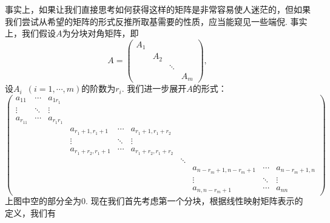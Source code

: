 事实上，如果让我们直接思考如何获得这样的矩阵是非常容易使人迷茫的，但如果我们尝试从希望的矩阵的形式反推所取基需要的性质，应当能窥见一些端倪. 事实上，我们假设$A$为分块对角矩阵，即
\[A=\begin{pmatrix}
        A_1 &     &        &     \\
            & A_2 &        &     \\
            &     & \ddots &     \\
            &     &        & A_m
    \end{pmatrix},\]
设$A_i\enspace(i=1,\cdots,m)$的阶数为$r_i$. 我们进一步展开$A$的形式：
\[\begin{pmatrix}
        a_{11}   & \cdots & a_{1r_1}   &                   &        &                     &        &                     &        &               \\
        \vdots   & \ddots & \vdots     &                   &        &                     &        &                     &        &               \\
        a_{r_11} & \cdots & a_{r_1r_1} &                   &        &                     &        &                     &        &               \\
                 &        &            & a_{r_1+1,r_1+1}   & \cdots & a_{r_1+1,r_1+r_2}   &        &                     &        &               \\
                 &        &            & \vdots            & \ddots & \vdots              &        &                     &        &               \\
                 &        &            & a_{r_1+r_2,r_1+1} & \cdots & a_{r_1+r_2,r_1+r_2} &        &                     &        &               \\
                 &        &            &                   &        &                     & \ddots &                     &        &               \\
                 &        &            &                   &        &                     &        & a_{n-r_m+1,n-r_m+1} & \cdots & a_{n-r_m+1,n} \\
                 &        &            &                   &        &                     &        & \vdots              & \ddots & \vdots        \\
                 &        &            &                   &        &                     &        & a_{n,n-r_m+1}       & \cdots & a_{nn}
    \end{pmatrix}\]
上图中空的部分全为$0$. 现在我们首先考虑第一个分块，根据线性映射矩阵表示的定义，我们有
